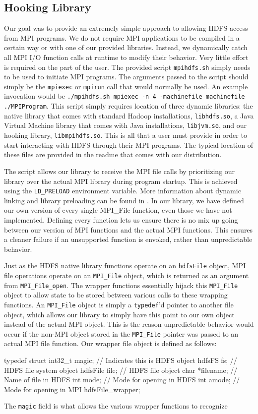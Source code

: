 \subsection{Hooking Library}
Our goal was to provide an extremely simple approach to allowing HDFS access from MPI programs. We do not require MPI applications to be compiled in a certain way or with one of our provided libraries. Instead, we dynamically catch all MPI I/O function calls at runtime to modify their behavior. Very little effort is required on the part of the user. The provided script \texttt{mpihdfs.sh} simply needs to be used to initiate MPI programs. The arguments passed to the script should simply be the \texttt{mpiexec} or \texttt{mpirun} call that would normally be used. An example invocation would be \texttt{./mpihdfs.sh mpiexec -n 4 -machinefile machinefile ./MPIProgram}. This script simply requires location of three dynamic libraries: the native library that comes with standard Hadoop installations, \texttt{libhdfs.so}, a Java Virtual Machine library that comes with Java installations, \texttt{libjvm.so}, and our hooking library, \texttt{libmpihdfs.so}. This is all that a user must provide in order to start interacting with HDFS through their MPI programs. The typical location of these files are provided in the readme that comes with our distribution.

The script allows our library to receive the MPI file calls by prioritizing our
library over the actual MPI library during program startup. This is achieved
using the \texttt{LD\_PRELOAD} environment variable. More information about
dynamic linking and library preloading can be found in \cite{ld.so}. In our
library, we have defined our own version of every single MPI\_File function, even those we have not implemented. Defining every function lets us ensure there is no mix up going between our version of MPI functions and the actual MPI functions. This ensures a cleaner failure if an unsupported function is envoked, rather than unpredictable behavior. 

Just as the HDFS native library functions operate on an \texttt{hdfsFile}
object, MPI file operations operate on an \texttt{MPI\_File} object, which is
returned as an argument from \texttt{MPI\_File\_open}. The wrapper functions
essentially hijack this \texttt{MPI\_File} object to allow state to be stored
between various calls to these wrapping functions. An \texttt{MPI\_File} object
is simply a \texttt{typedef}'d pointer to another file object, which allows our
library to simply have this point to our own object instead of the actual MPI
object. This is the reason unpredictable behavior would occur if the non-MPI
object stored in the \texttt{MPI\_File} pointer was passed to an actual MPI file function. Our wrapper file object is defined as follows:

{\ttfamily
typedef struct
{
	int32\_t magic;	// Indicates this is HDFS object
	hdfsFS fs;	// HDFS file system object
	hdfsFile file;	// HDFS file object
	char *filename; // Name of file in HDFS
	int mode;	// Mode for opening in HDFS
	int amode;	// Mode for opening in MPI
} hdfsFile\_wrapper;
}

The \texttt{magic} field is what allows the various wrapper functions to recognize 
